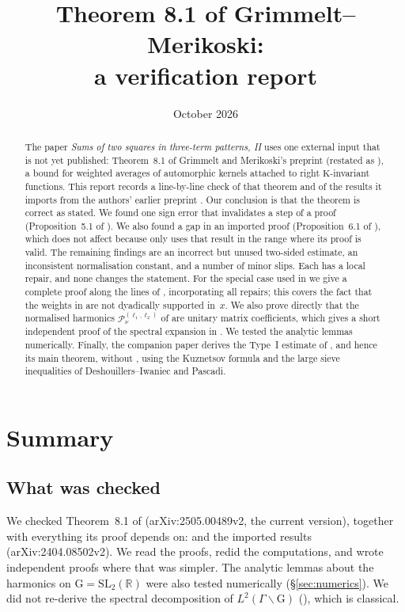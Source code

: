 \documentclass[11pt]{amsart}
\title[Theorem 8.1 of Grimmelt--Merikoski]{Theorem 8.1 of Grimmelt--Merikoski:\\ a verification report}
\date{October 2026}
\theoremstyle{remark}
\theoremstyle{definition}
\numberwithin{equation}{section}
\newcommand{\R}{\mathbb{R}}
\newcommand{\G}{\mathrm{G}}
\newcommand{\K}{\mathrm{K}}
\newcommand{\SL}{\mathrm{SL}}
\newcommand{\Pc}{\mathcal{P}}
\begin{document}
\begin{abstract}
The paper \emph{Sums of two squares in three-term patterns, II} \cite{II} uses one external input that is not yet published: Theorem~8.1 of Grimmelt and Merikoski's preprint \cite{GM1} (restated as \cite[Theorem~2.1]{GM2}), a bound for weighted averages of automorphic kernels attached to right $\K$-invariant functions. This report records a line-by-line check of that theorem and of the results it imports from the authors' earlier preprint \cite{GM0}. Our conclusion is that the theorem is correct as stated. We found one sign error that invalidates a step of a proof (Proposition~5.1 of \cite{GM1}). We also found a gap in an imported proof (Proposition~6.1 of \cite{GM0}), which does not affect \cite{GM1} because \cite{GM1} only uses that result in the range where its proof is valid. The remaining findings are an incorrect but unused two-sided estimate, an inconsistent normalisation constant, and a number of minor slips. Each has a local repair, and none changes the statement. For the special case used in \cite{II} we give a complete proof along the lines of \cite{GM1}, incorporating all repairs; this covers the fact that the weights in \cite{II} are not dyadically supported in~$x$. We also prove directly that the normalised harmonics $\Pc^{(\ell_1,\ell_2)}_\nu$ of \cite{GM1} are unitary matrix coefficients, which gives a short independent proof of the spectral expansion in \cite[\S3]{GM1}. We tested the analytic lemmas numerically. Finally, the companion paper \cite{KUZ} derives the Type~I estimate of \cite{II}, and hence its main theorem, without \cite{GM1}, using the Kuznetsov formula and the large sieve inequalities of Deshouillers--Iwaniec and Pascadi.
\end{abstract}

\maketitle
\setcounter{tocdepth}{1}
\tableofcontents

\section{Summary}\label{sec:summary}

\subsection*{What was checked}
We checked Theorem~8.1 of \cite{GM1} (arXiv:2505.00489v2, the current version), together with everything its proof depends on: \cite[\S\S2--8]{GM1} and the imported results \cite[Propositions~5.1, 5.2, 6.1, Lemmas~6.2--6.4, \S7.3]{GM0} (arXiv:2404.08502v2). We read the proofs, redid the computations, and wrote independent proofs where that was simpler. The analytic lemmas about the harmonics on $\G=\SL_2(\R)$ were also tested numerically (\S\ref{sec:numerics}). We did not re-derive the spectral decomposition of $L^2(\Gamma\backslash\G)$ (\cite[Proposition~2.2]{GM1}), which is classical.
\end{document}
